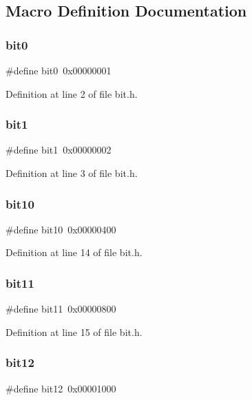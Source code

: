 \subsection{Macro Definition Documentation}
\mbox{\label{bit_8h_a1c5fa67df470b8171b08c9f94221527c}} 
\subsubsection{bit0}
{\footnotesize\ttfamily \#define bit0~0x00000001}



Definition at line 2 of file bit.\+h.

\mbox{\label{bit_8h_a2431824c6b62c6f5a406df2e6427d730}} 
\subsubsection{bit1}
{\footnotesize\ttfamily \#define bit1~0x00000002}



Definition at line 3 of file bit.\+h.

\mbox{\label{bit_8h_a5ae9c0772c511a43a17f0edfc7f751ad}} 
\subsubsection{bit10}
{\footnotesize\ttfamily \#define bit10~0x00000400}



Definition at line 14 of file bit.\+h.

\mbox{\label{bit_8h_a3a636e34d7475a9a673fbdec8ff559fa}} 
\subsubsection{bit11}
{\footnotesize\ttfamily \#define bit11~0x00000800}



Definition at line 15 of file bit.\+h.

\mbox{\label{bit_8h_a79ed0b53c008c8db10d2f45fb8d53464}} 
\subsubsection{bit12}
{\footnotesize\ttfamily \#define bit12~0x00001000}



